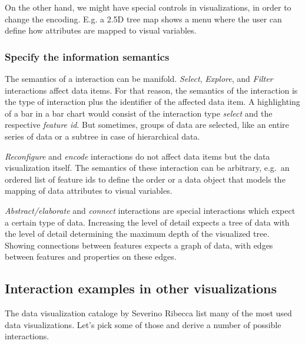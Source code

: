 \documentclass{article}
\newcommand{\tmap}{\textsc{2.5D} tree map}
\begin{document}
On the other hand, we might have special controls in visualizations, in order to change the encoding.
E.g. a \tmap{} shows a menu where the user can define how attributes are mapped to visual variables.

\subsubsection{Specify the information semantics}

The semantics of a interaction can be manifold.
\emph{Select}, \emph{Explore}, and \emph{Filter} interactions affect data items.
For that reason, the semantics of the interaction is the type of interaction plus the identifier of the affected data item.
A highlighting of a bar in a bar chart would consist of the interaction type \emph{select} and the respective \emph{feature id}.
But sometimes, groups of data are selected, like an entire series of data or a subtree in case of hierarchical data.

\emph{\emph{Reconfigure}} and \emph{encode} interactions do not affect data items but the data visualization itself.
The semantics of these interaction can be arbitrary, e.g.\ an ordered list of feature ids to define the order or a data object that models the mapping of data attributes to visual variables.

\emph{Abstract/elaborate} and \emph{connect} interactions are special interactions which expect a certain type of data.
Increasing the level of detail expects a tree of data with the level of detail determining the maximum depth of the visualized tree.
Showing connections between features expects a graph of data, with edges between features and properties on these edges.


\subsection{Interaction examples in other visualizations}\label{sec:analysis:examples}

The data visualization cataloge by Severino Ribecca list many of the most used data visualizations\cite{VisualizationCatalogue2017}.
Let's pick some of those and derive a number of possible interactions.

\end{document}
